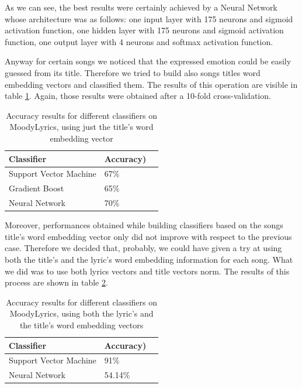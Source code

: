 As we can see, the best results were certainly achieved by a Neural Network whose architecture was as follows: one input layer with 175 neurons and sigmoid activation function, one hidden layer with 175 neurons and sigmoid activation function, one output layer with 4 neurons and softmax activation function.

Anyway for certain songs we noticed that the expressed emotion could be easily guessed from its title. Therefore
we tried to build also songs titles word embedding vectors and classified them. The results of this operation are 
visible in table \ref{table:ml-simple-results-title}. Again, those results were obtained after a 10-fold cross-validation. 

\begin{table}[H]
\centering
\begin{tabular}{@{}lll@{}}
\toprule
\textbf{Classifier} & \textbf{Accuracy})   \\ \midrule
Support Vector Machine & 67\%  \\
Gradient Boost & 65\%  \\
Neural Network & 70\%  \\
\end{tabular}
\caption{Accuracy results for different classifiers on MoodyLyrics, using just the title's word embedding vector}
\label{table:ml-simple-results-title}
\end{table}

Moreover, performances obtained while building classifiers based on the songs title's word embedding vector only
did not improve with respect to the previous case. Therefore we decided
that, probably, we could have given a try at using both the title's and the lyric's word embedding information for each
song. What we did was to use both lyrics vectors and title vectors norm. The results of this process are shown in table \ref{table:ml-simple-results-both}.

\begin{table}[H]
\centering
\begin{tabular}{@{}lll@{}}
\toprule
\textbf{Classifier} & \textbf{Accuracy})   \\ \midrule
Support Vector Machine & 91\%  \\
Neural Network & 54.14\%  \\
\end{tabular}
\caption{Accuracy results for different classifiers on MoodyLyrics, using both the lyric's and the title's word embedding vectors}
\label{table:ml-simple-results-both}
\end{table}


